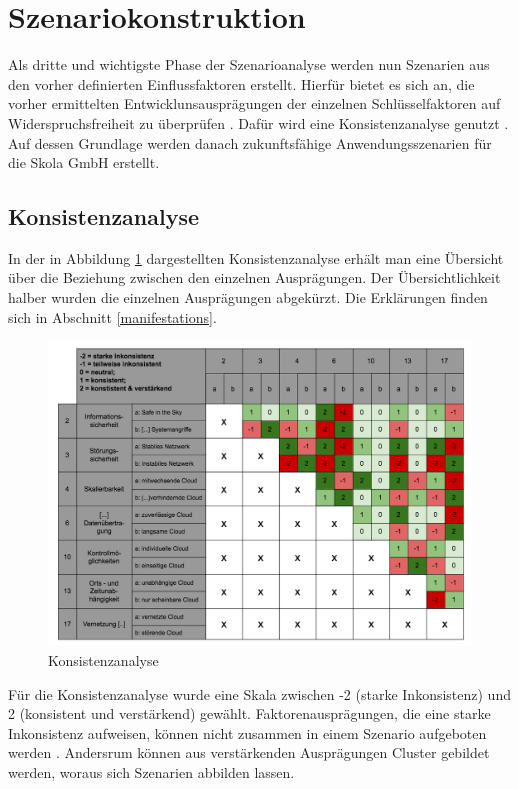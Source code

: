 \section{Szenariokonstruktion}
\label{constructions}
Als dritte und wichtigste Phase der Szenarioanalyse werden nun Szenarien aus den vorher definierten Einflussfaktoren erstellt. Hierfür bietet es sich an, die vorher ermittelten Entwicklunsausprägungen der einzelnen Schlüsselfaktoren auf Widerspruchsfreiheit zu überprüfen . Dafür wird eine Konsistenzanalyse genutzt \cite{spath}. Auf dessen Grundlage werden danach zukunftsfähige Anwendungsszenarien für die Skola GmbH erstellt.

\subsection{Konsistenzanalyse}

In der in Abbildung \ref{fig:konsistenzanalyse} dargestellten Konsistenzanalyse erhält man eine Übersicht über die Beziehung zwischen den einzelnen Ausprägungen. Der Übersichtlichkeit halber wurden die einzelnen Ausprägungen abgekürzt. Die Erklärungen finden sich in Abschnitt \ref{manifestations}.

\begin{figure}
	\centering
	\includegraphics[width=\linewidth]{images/konsistenzanalyse}
	\caption[Caption for parameters]{Konsistenzanalyse}
	\label{fig:konsistenzanalyse}
\end{figure}

Für die Konsistenzanalyse wurde eine Skala zwischen -2 (starke Inkonsistenz) und 2 (konsistent und verstärkend) gewählt. Faktorenausprägungen, die eine starke Inkonsistenz aufweisen, können nicht zusammen in einem Szenario aufgeboten werden \cite{spath}. Andersrum können aus verstärkenden Ausprägungen Cluster gebildet werden, woraus sich Szenarien abbilden lassen.

